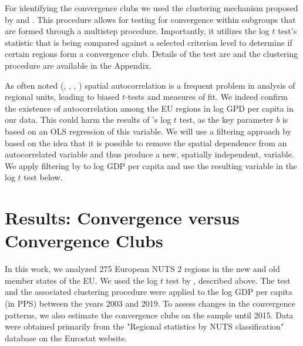 \documentclass[11pt]{article}
\begin{document}
For identifying the convergence clubs we used the clustering mechanism proposed by \citet{phillips2009economic} and \citet{bartkowska2012regional}. This procedure allows for testing for convergence within subgroups that are formed through a multistep procedure. Importantly, it utilizes the log $t$ test's statistic that is being compared against a selected criterion level to determine if certain regions form a convergence club. Details of the test are and the clustering procedure are available in the Appendix.

As often noted (\citet{dall2008regional}, \citet{magrini2004regional}, \citet{anselin1991properties}, \citet{anselin2001spatial}) spatial autocorrelation is a frequent problem in analysis of regional units, leading to biased $t$-tests and measures of fit. We indeed confirm the existence of autocorrelation among the EU regions in log GPD per capita in our data. This could harm the results of \citeauthor{phillips2007transition}'s log $t$ test, as the key parameter $b$ is based on an OLS regression of this variable. We will use a filtering approach by \cite{getis2002comparative} based on the idea that it is possible to remove the spatial dependence from an autocorrelated variable and thus produce a new, spatially independent, variable. We apply filtering by \cite{getis2002comparative} to log GDP per capita and use the resulting variable in the log $t$ test below.



\section{Results: Convergence versus Convergence Clubs}
In this work, we analyzed 275 European NUTS 2 regions in the new and old member states of the EU. We used the log $t$ test by \citet{phillips2009economic}, described above. The test and the associated clustering procedure were applied to the log GDP per capita (in PPS) between the years 2003 and 2019. To assess changes in the convergence patterns, we also estimate the convergence clubs on the sample until 2015. Data were obtained primarily from the "Regional statistics by NUTS classification" database on the Eurostat website.

\begin{table}[!htbp] \centering 
 \caption{Log $t$ test result for all regions} 
  \label{Table_overall} 
\end{table}
\end{document}
